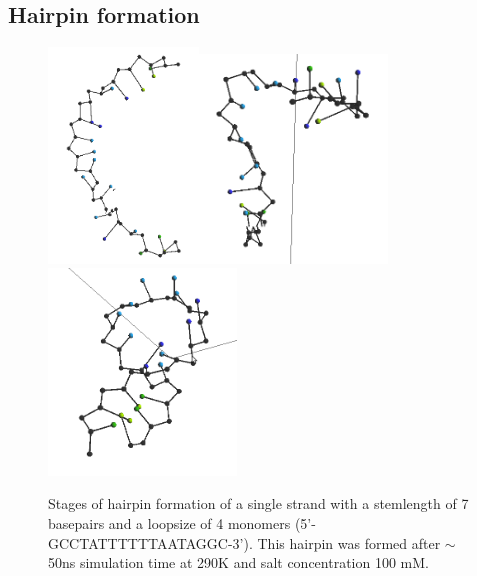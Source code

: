 \subsection{Hairpin formation}

\begin{figure}[hbt]
\begin{center}
\includegraphics[width=4cm]{images/results_hairpin1}\includegraphics[width=5cm]{images/results_hairpin2}\includegraphics[width=5cm]{images/results_hairpin3}
\end{center}
\caption{Stages of hairpin formation of a single strand with a stemlength of 7 basepairs and a loopsize of 4 monomers (5'-GCCTATTTTTTAATAGGC-3'). This hairpin was formed after $\sim$ 50ns simulation time at 290K and salt concentration 100 mM.}
\label{results_hairpin}
\end{figure}





